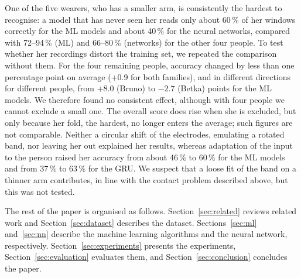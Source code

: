 \documentclass[conference]{IEEEtran}
\begin{document}
One of the five wearers, who has a smaller arm, is consistently the hardest to
recognise: a model that has never seen her reads only about 60\,\% of her
windows correctly for the ML models and about 40\,\% for the neural networks,
compared with 72--94\,\% (ML) and 66--80\,\% (networks) for the other four people. To test whether her
recordings distort the training set, we repeated the comparison without them.
For the four remaining people, accuracy changed by less than one percentage
point on average (+0.9 for both families), and in different directions for
different people, from +8.0 (Bruno) to $-2.7$ (Betka) points for the ML models. We
therefore found no consistent effect, although with four people we cannot
exclude a small one. The overall score does rise when she is excluded, but only
because her fold, the hardest, no longer enters the average; such figures are
not comparable. Neither a circular shift of the electrodes, emulating a rotated
band, nor leaving her out explained her results, whereas adaptation of the
input to the person raised her accuracy from about 46\,\% to 60\,\% for the ML
models and from 37\,\% to 63\,\% for the GRU. We
suspect that a loose fit of the band on a thinner arm contributes, in line
with the contact problem described above, but this was not tested.

The rest of the paper is organised as follows. Section~\ref{sec:related}
reviews related work and Section~\ref{sec:dataset} describes the dataset.
Sections~\ref{sec:ml} and~\ref{sec:nn} describe the machine learning
algorithms and the neural network, respectively. Section~\ref{sec:experiments}
presents the experiments, Section~\ref{sec:evaluation} evaluates them, and
Section~\ref{sec:conclusion} concludes the paper.
\end{document}
